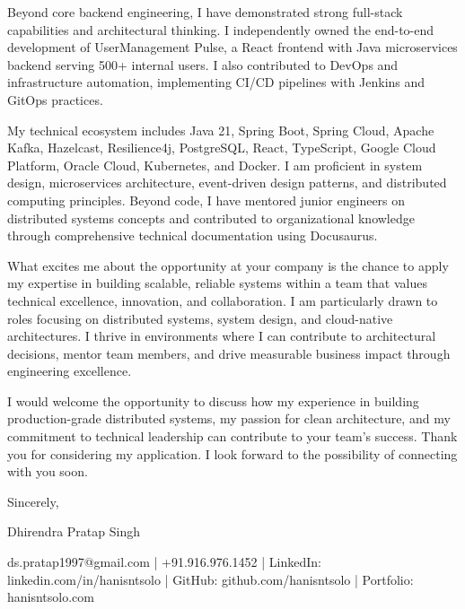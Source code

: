 \documentclass[]{hanisntsolo-resume}
\begin{document}
\vspace{0.1in}

Beyond core backend engineering, I have demonstrated strong full-stack capabilities and architectural thinking. I independently owned the end-to-end development of UserManagement Pulse, a React frontend with Java microservices backend serving 500+ internal users. I also contributed to DevOps and infrastructure automation, implementing CI/CD pipelines with Jenkins and GitOps practices.

\vspace{0.1in}

My technical ecosystem includes Java 21, Spring Boot, Spring Cloud, Apache Kafka, Hazelcast, Resilience4j, PostgreSQL, React, TypeScript, Google Cloud Platform, Oracle Cloud, Kubernetes, and Docker. I am proficient in system design, microservices architecture, event-driven design patterns, and distributed computing principles. Beyond code, I have mentored junior engineers on distributed systems concepts and contributed to organizational knowledge through comprehensive technical documentation using Docusaurus.

\vspace{0.1in}

What excites me about the opportunity at your company is the chance to apply my expertise in building scalable, reliable systems within a team that values technical excellence, innovation, and collaboration. I am particularly drawn to roles focusing on distributed systems, system design, and cloud-native architectures. I thrive in environments where I can contribute to architectural decisions, mentor team members, and drive measurable business impact through engineering excellence.

\vspace{0.1in}

I would welcome the opportunity to discuss how my experience in building production-grade distributed systems, my passion for clean architecture, and my commitment to technical leadership can contribute to your team's success. Thank you for considering my application. I look forward to the possibility of connecting with you soon.

\vspace{0.2in}

Sincerely,

\vspace{0.5in}

Dhirendra Pratap Singh

\vspace{0.1in}

ds.pratap1997@gmail.com | +91.916.976.1452 | LinkedIn: linkedin.com/in/hanisntsolo | GitHub: github.com/hanisntsolo | Portfolio: hanisntsolo.com
\end{document}
